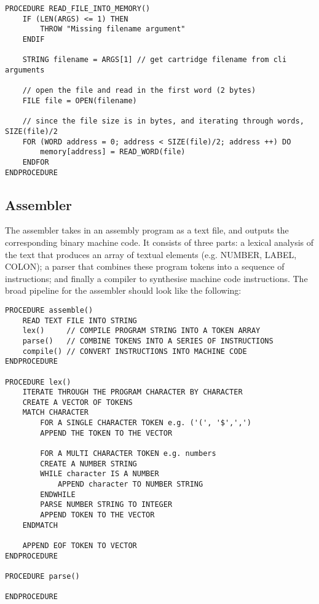 \begin{lstlisting}
PROCEDURE READ_FILE_INTO_MEMORY() 
    IF (LEN(ARGS) <= 1) THEN 
        THROW "Missing filename argument"
    ENDIF 

    STRING filename = ARGS[1] // get cartridge filename from cli arguments

    // open the file and read in the first word (2 bytes)
    FILE file = OPEN(filename)

    // since the file size is in bytes, and iterating through words, SIZE(file)/2
    FOR (WORD address = 0; address < SIZE(file)/2; address ++) DO
        memory[address] = READ_WORD(file)
    ENDFOR
ENDPROCEDURE
\end{lstlisting}


\subsection{Assembler}
The assembler takes in an assembly program as a text file, and outputs the corresponding binary machine code. It consists of three parts: a lexical analysis of the text that produces an array of textual elements (e.g. NUMBER, LABEL, COLON); a parser that combines these program tokens into a sequence of instructions; and finally a compiler to synthesise machine code instructions. The broad pipeline for the assembler should look like the following:

\begin{lstlisting}
PROCEDURE assemble() 
    READ TEXT FILE INTO STRING
    lex()     // COMPILE PROGRAM STRING INTO A TOKEN ARRAY
    parse()   // COMBINE TOKENS INTO A SERIES OF INSTRUCTIONS
    compile() // CONVERT INSTRUCTIONS INTO MACHINE CODE
ENDPROCEDURE

PROCEDURE lex() 
    ITERATE THROUGH THE PROGRAM CHARACTER BY CHARACTER
    CREATE A VECTOR OF TOKENS
    MATCH CHARACTER 
        FOR A SINGLE CHARACTER TOKEN e.g. ('(', '$',',')
        APPEND THE TOKEN TO THE VECTOR

        FOR A MULTI CHARACTER TOKEN e.g. numbers
        CREATE A NUMBER STRING
        WHILE character IS A NUMBER 
            APPEND character TO NUMBER STRING 
        ENDWHILE 
        PARSE NUMBER STRING TO INTEGER 
        APPEND TOKEN TO THE VECTOR
    ENDMATCH

    APPEND EOF TOKEN TO VECTOR
ENDPROCEDURE

PROCEDURE parse()

ENDPROCEDURE
\end{lstlisting}

